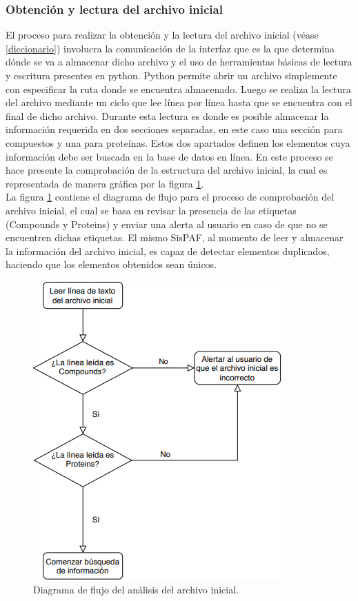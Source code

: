 \subsubsection{Obtención y lectura del archivo inicial}{
\noindent El proceso para realizar la obtención y la lectura del archivo inicial (véase \ref{diccionario}) involucra la comunicación de la interfaz que es la que determina dónde se va a almacenar dicho archivo y el uso de herramientas básicas de lectura y escritura presentes en python. Python permite abrir un archivo simplemente con especificar la ruta donde se encuentra almacenado. Luego se realiza la lectura del archivo mediante un ciclo que lee línea por línea hasta que se encuentra con el final de dicho archivo. Durante esta lectura es donde es posible almacenar la información requerida en dos secciones separadas, en este caso una sección para compuestos y una para proteínas. Estos dos apartados definen los elementos cuya información debe ser buscada en la base de datos en línea.
En este proceso se hace presente la comprobación de la estructura del archivo inicial, la cual es representada de manera gráfica por la figura \ref{flujo}.\\


\noindent La figura \ref{flujo} contiene el diagrama de flujo para el proceso de comprobación del archivo inicial, el cual se basa en revisar la presencia de las etiquetas (Compounds y Proteins) y enviar una alerta al usuario en caso de que no se encuentren dichas etiquetas. El mismo SisPAF, al momento de leer y almacenar la información del archivo inicial, es capaz de detectar elementos duplicados, haciendo que los elementos obtenidos sean únicos.

\begin{figure}[H]
    \centering
    \includegraphics[scale=0.85]{Capitulo4/imagenes/diagramaArchivoInicia.png}
    \caption{Diagrama de flujo del análisis del archivo inicial.}
    \label{flujo}
\end{figure}
}
